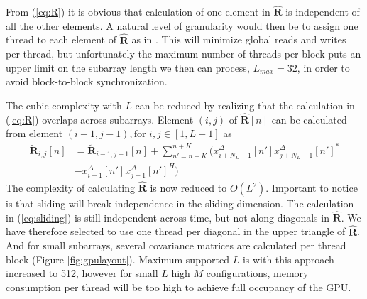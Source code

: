 \documentclass[conference]{IEEEtran}
\newcommand{\mat}[1]{\mathbf{#1}}
\renewcommand{\vec}[1]{\mathbf{#1}}
\begin{document}
From (\ref{eq:R}) it is obvious that calculation of one element in $\mat{\hat{R}}$ is independent of all the other elements. A natural level of granularity would then be to assign one thread to each element of $\mat{\hat{R}}$ as in \cite{Chen2011}. This will minimize global reads and writes per thread, but unfortunately the maximum number of threads per block puts an upper limit on the subarray length we then can process, $L_{max}=32$, in order to avoid block-to-block synchronization.

The cubic complexity with $L$ can be reduced by realizing that the calculation in (\ref{eq:R}) overlaps across subarrays. Element $(i,j)$ of $\mat{\hat{R}}[n]$ can be calculated from element $(i-1, j-1), \text{for } i,j \in [1, L-1]$ as
\begin{align}
\mat{\breve{R}}_{i,j}[n] &=  \mat{\breve{R}}_{i-1,j-1}[n]  + \sum_{n'=n-K}^{n+K} (x_{i+N_L-1}^{\Delta}[n']x_{j+N_L-1}^{\Delta}[n']^* \nonumber \\
 &- x_{i-1}^{\Delta}[n']x_{j-1}^{\Delta}[n']^H) \label{eq:sliding}
\end{align}
The complexity of calculating $\mat{\hat{R}}$ is now reduced to $O(L^2)$. Important to notice is that sliding will break independence in the sliding dimension. The calculation in (\ref{eq:sliding}) is still independent across time, but not along diagonals in $\mat{\hat{R}}$. We have therefore selected to use one thread per diagonal in the upper triangle of $\mat{\hat{R}}$. And for small subarrays, several covariance matrices are calculated per thread block (Figure \ref{fig:gpulayout}). Maximum supported $L$ is with this approach increased to 512, however for small $L$ high $M$ configurations, memory consumption per thread will be too high to achieve full occupancy of the GPU.
\end{document}

